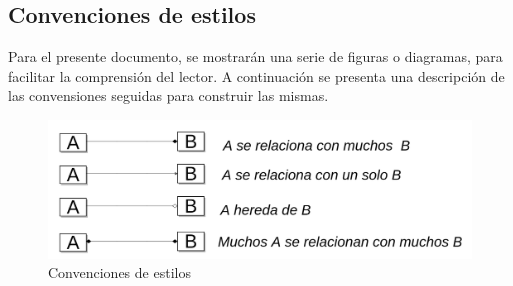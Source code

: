 \begin{introduction}
	\section{Convenciones de estilos}
	
	Para el presente documento, se mostrarán una serie de figuras o diagramas, para facilitar la comprensión del lector. A continuación se presenta una descripción de las convensiones seguidas para construir las mismas.
	
	\begin{figure}[h!]
		\centering
		\includegraphics[width=1\linewidth]{images/Introduction/style_conventions}
		\caption{Convenciones de estilos}
		\label{fig:style_conventions}
	\end{figure}
	
	

\end{introduction}
